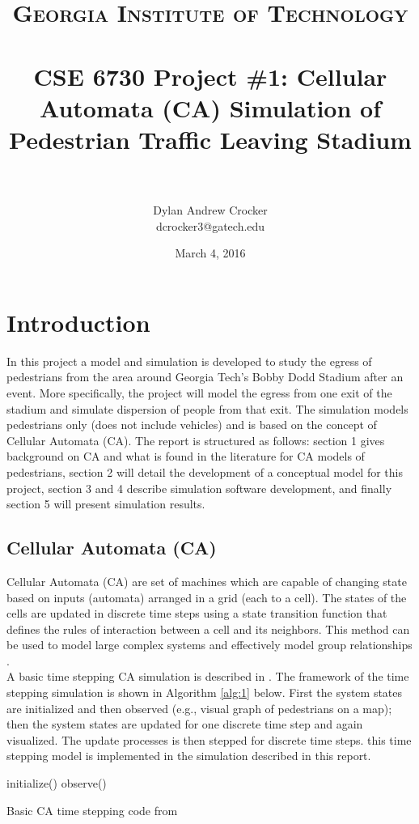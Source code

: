 \documentclass[paper=a4, fontsize=11pt]{scrartcl}
\title{ 	
	\usefont{OT1}{bch}{b}{n}
	\normalfont \normalsize \textsc{Georgia Institute of Technology} \\ [25pt]
	\horrule{0.5pt} \\[0.4cm]
	\huge CSE 6730 Project \#1: Cellular Automata (CA) Simulation of Pedestrian Traffic Leaving Stadium \\
	\horrule{2pt} \\[0.5cm]
}
\author{
	Dylan Andrew Crocker\\
	dcrocker3@gatech.edu
}
\date{March 4, 2016}
\numberwithin{equation}{section}		%
\numberwithin{figure}{section}			%
\numberwithin{table}{section}		    %
\begin{document}
\maketitle

\section{Introduction}
In this project a model and simulation is developed to study the egress of pedestrians from the 
area around Georgia Tech's Bobby Dodd Stadium after an event. More specifically, the project will 
model the egress from one exit of the stadium and simulate dispersion of people from that exit. The 
simulation models pedestrians only (does not include vehicles) and is based on the concept of 
Cellular Automata (CA). The report is structured as follows: section 1 gives background on CA and 
what is found in the literature for CA models of pedestrians, section 2 will detail the development 
of a conceptual model for this project, section 3 and 4 describe simulation software development, 
and finally section 5 will present simulation results. 

\subsection{Cellular Automata (CA)}
Cellular Automata (CA) are set of machines which are capable of changing state based on inputs 
(automata) arranged in a grid (each to a cell)\cite{SayamaBook}. The states of the cells are 
updated in discrete time steps using a state transition function that defines the rules of 
interaction between a cell and its neighbors. This method can be used to model large complex 
systems and effectively model group relationships \cite{SayamaBook}.\\
	
\noindent
A basic time stepping CA simulation is described in \cite{SayamaBook}. The framework of the time 
stepping simulation is shown in Algorithm \ref{alg:1} below. First the system states are 
initialized and then observed (e.g., visual graph of pedestrians on a map); then the system states 
are updated for one discrete time step and again visualized. The update processes is then stepped 
for discrete time steps. this time stepping model is implemented in the simulation described in 
this report.

\begin{algorithm}[h]
	initialize()\;
	observe()\;
\caption{Basic CA time stepping code from \cite{SayamaBook} \label{alg:1}}
\end{algorithm}
\end{document}
